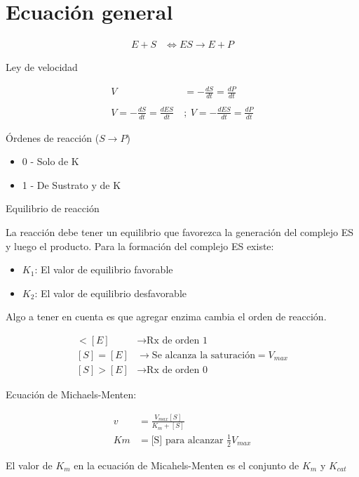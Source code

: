 \section{Ecuación general}

\begin{align*}
    E+S &\Longleftrightarrow ES \longrightarrow E + P
\end{align*}

Ley de velocidad

\begin{align*}
    V &= -\frac{dS}{dt} = \frac{dP}{dt}
    \\
    \\
    V = -\frac{dS}{dt} = \frac{dES}{dt} \ &; \ V = -\frac{dES}{dt} = \frac{dP}{dt}
\end{align*}

Órdenes de reacción ($S \longrightarrow P$)

\begin{itemize}
    \item 0 - Solo de K
    \item 1 - De Sustrato y de K
\end{itemize}



Equilibrio de reacción

La reacción debe tener un equilibrio que favorezca la generación del complejo ES y luego el producto.
Para la formación del complejo ES existe:

\begin{itemize}
    \item $K_{1}$: El valor de equilibrio favorable
    \item $K_{2}$: El valor de equilibrio desfavorable
\end{itemize}

Algo a tener en cuenta es que agregar enzima cambia el orden de reacción.

\begin{align*}
    [S] < [E] &\longrightarrow \text{Rx de orden 1}
    \\
    [S] = [E] &\longrightarrow \text{Se alcanza la saturación} = V_{max}
    \\
    [S] > [E] &\longrightarrow \text{Rx de orden 0}
\end{align*}

Ecuación de Michaels-Menten:

\begin{align*}
    v &= \frac{V_{max}[S]}{K_{m} + [S]}
    \\
    Km &= \text{[S] para alcanzar }\frac{1}{2}V_{max}
\end{align*}

El valor de $K_{m}$ en la ecuación de Micahels-Menten es el conjunto de $K_{m}$ y $K_{cat}$